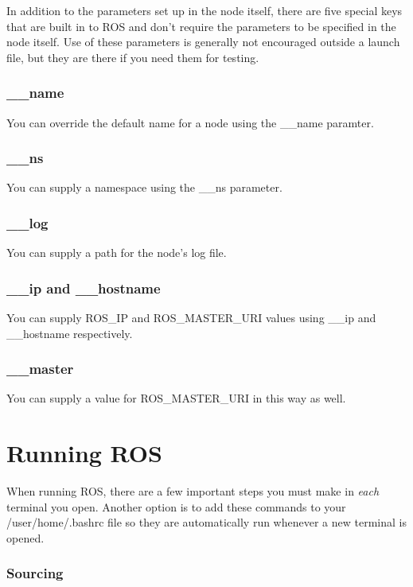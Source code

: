 In addition to the parameters set up in the node itself, there are five special keys that are built in to ROS and don't require the parameters to be specified in the node itself. Use of these parameters is generally not encouraged outside a launch file, but they are there if you need them for testing.
 
\subsubsection{\_\_name}

You can override the default name for a node using the \_\_name paramter.

\subsubsection{\_\_ns}

You can supply a namespace using the \_\_ns parameter.

\subsubsection{\_\_log}

You can supply a path for the node's log file.

\subsubsection{\_\_ip and \_\_hostname}

You can supply ROS\_IP and ROS\_MASTER\_URI values using \_\_ip and \_\_hostname respectively.

\subsubsection{\_\_master}

You can supply a value for ROS\_MASTER\_URI in this way as well.
 
\section{Running ROS}

When running ROS, there are a few important steps you must make in \textit{each} terminal you open. Another option is to add these commands to your /user/home/.bashrc file so they are automatically run whenever a new terminal is opened.

\subsubsection{Sourcing}


